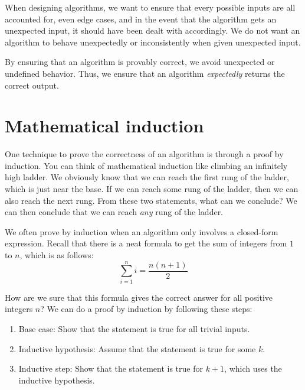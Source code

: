 When designing algorithms, we want to ensure that every possible inputs are all accounted for, even edge cases, and in the event that the algorithm gets an unexpected input, it should have been dealt with accordingly. We do not want an algorithm to behave unexpectedly or inconsistently when given unexpected input.

By ensuring that an algorithm is provably correct, we avoid unexpected or undefined behavior. Thus, we ensure that an algorithm \textit{expectedly} returns the correct output.

\section{Mathematical induction}
One technique to prove the correctness of an algorithm is through a proof by induction. %
You can think of mathematical induction like climbing an infinitely high ladder. We obviously know that we can reach the first rung of the ladder, which is just near the base. If we can reach some rung of the ladder, then we can also reach the next rung. From these two statements, what can we conclude? We can then conclude that we can reach \textit{any} rung of the ladder.

We often prove by induction when an algorithm only involves a closed-form expression. Recall that there is a neat formula to get the sum of integers from $1$ to $n$, which is as follows:
\[
\sum_{i=1}^{n} i = \frac{n\left(n+1\right)}{2}
\]

How are we sure that this formula gives the correct answer for all positive integers $n$? We can do a proof by induction by following these steps:
\begin{enumerate}
    \item Base case: Show that the statement is true for all trivial inputs.
    \item Inductive hypothesis: Assume that the statement is true for some $k$.
    \item Inductive step: Show that the statement is true for $k+1$, which uses the inductive hypothesis.
\end{enumerate}

